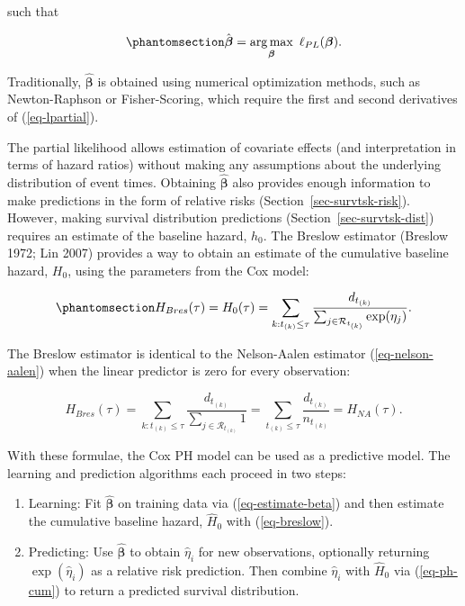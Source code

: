 \documentclass[
  letterpaper,
  krantz2]{style/krantz}
\providecommand{\tightlist}{%
  \setlength{\itemsep}{0pt}\setlength{\parskip}{0pt}}
\begin{document}
such that

\begin{equation}\phantomsection\label{eq-estimate-beta}{
\hat{\boldsymbol{\beta}} = \mathop{\mathrm{arg\,max}}_{\boldsymbol{\beta}}\ \ell_{PL}(\boldsymbol{\beta}).
}\end{equation}

Traditionally, \(\hat{\boldsymbol{\beta}}\) is obtained using numerical
optimization methods, such as Newton-Raphson or Fisher-Scoring, which
require the first and second derivatives of (\ref{eq-lpartial}).

The partial likelihood allows estimation of covariate effects (and
interpretation in terms of hazard ratios) without making any assumptions
about the underlying distribution of event times. Obtaining
\(\hat{\boldsymbol{\beta}}\) also provides enough information to make
predictions in the form of relative risks
(Section~\ref{sec-survtsk-risk}). However, making survival distribution
predictions (Section~\ref{sec-survtsk-dist}) requires an estimate of the
baseline hazard, \(h_0\). The Breslow
estimator (Breslow
1972; Lin 2007) provides a way to obtain an estimate of the cumulative
baseline hazard, \(H_0\), using the parameters from the Cox model:

\begin{equation}\phantomsection\label{eq-breslow}{
H_{Bres}(\tau) = H_0(\tau) = \sum_{k:t_{(k)}\leq \tau} \frac{d_{t_{(k)}}}{\sum_{j \in \mathcal{R}_{t_{(k)}}} \exp(\eta_j)}.
}\end{equation}

The Breslow estimator is identical to the Nelson-Aalen
estimator (\ref{eq-nelson-aalen}) when the
linear predictor is zero for every observation:

\[
H_{Bres}(\tau) = \sum_{k:t_{(k)}\leq \tau} \frac{d_{t_{(k)}}}{\sum_{j \in \mathcal{R}_{t_{(k)}}} 1} = \sum_{t_{(k)}\leq \tau} \frac{d_{t_{(k)}}}{n_{t_{(k)}}} = H_{NA}(\tau).
\]

With these formulae, the Cox PH model can be used as a predictive model.
The learning and prediction algorithms each proceed in two steps:

\begin{enumerate}
\def\labelenumi{\arabic{enumi}.}
\tightlist
\item
  Learning: Fit \(\hat{\boldsymbol{\beta}}\) on training data via
  (\ref{eq-estimate-beta}) and then estimate the cumulative baseline
  hazard, \(\hat{H}_0\) with (\ref{eq-breslow}).
\item
  Predicting: Use \(\hat{\boldsymbol{\beta}}\) to obtain
  \(\hat{\eta}_i\) for new observations, optionally returning
  \(\exp(\hat{\eta}_i)\) as a relative risk prediction. Then combine
  \(\hat{\eta}_i\) with \(\hat{H}_0\) via (\ref{eq-ph-cum}) to return a
  predicted survival distribution.
\end{enumerate}
\end{document}
